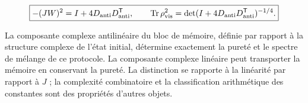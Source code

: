 \begin{equation}
\boxed{-(JW)^2=I+4D_{\rm anti}D_{\rm anti}^{\mathsf T},\qquad
\operatorname{Tr}\rho_{\rm vis}^2
=\det(I+4D_{\rm anti}D_{\rm anti}^{\mathsf T})^{-1/4}.}
\label{x_reciprocidad:nuc12:eq:6.6}
\end{equation}



La composante complexe antilinéaire du bloc de mémoire, définie par rapport à la structure complexe de l’état initial, détermine exactement la pureté et le spectre de mélange de ce protocole. La composante complexe linéaire peut transporter la mémoire en conservant la pureté. La distinction se rapporte à la linéarité par rapport à \(J\) ; la complexité combinatoire et la classification arithmétique des constantes sont des propriétés d’autres objets.
